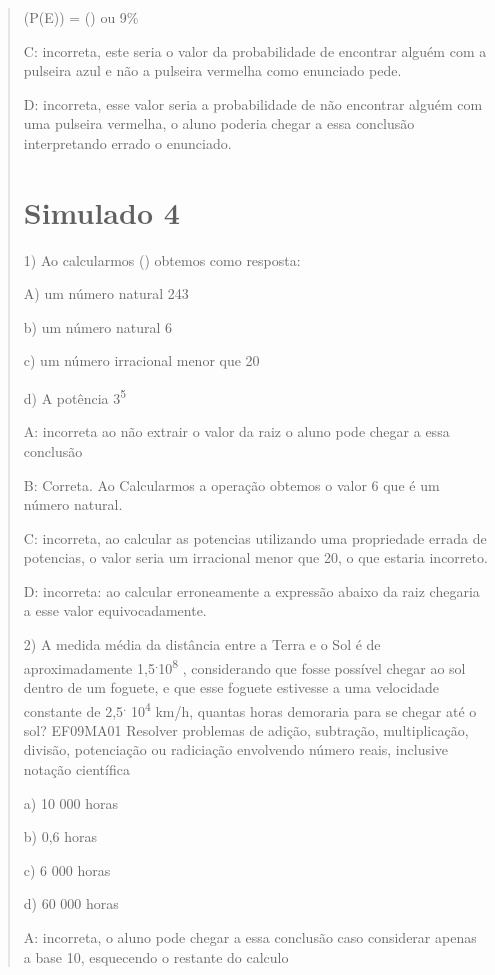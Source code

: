 \begin{quote}
\begin{escolha}
(P(E)) = () ou 9\%

C: incorreta, este seria o valor da probabilidade de encontrar alguém
com a pulseira azul e não a pulseira vermelha como enunciado pede.

D: incorreta, esse valor seria a probabilidade de não encontrar alguém
com uma pulseira vermelha, o aluno poderia chegar a essa conclusão
interpretando errado o enunciado.

\section{Simulado 4}

1) Ao calcularmos () obtemos como resposta:

A) um número natural 243

b) um número natural 6

c) um número irracional menor que 20

d) A potência 3\textsuperscript{5}

A: incorreta ao não extrair o valor da raiz o aluno pode chegar a essa
conclusão

B: Correta. Ao Calcularmos a operação obtemos o valor 6 que é um número
natural.

C: incorreta, ao calcular as potencias utilizando uma propriedade errada
de potencias, o valor seria um irracional menor que 20, o que estaria
incorreto.

D: incorreta: ao calcular erroneamente a expressão abaixo da raiz
chegaria a esse valor equivocadamente.

2) A medida média da distância entre a Terra e o Sol é de
aproximadamente 1,5\textsuperscript{.}10\textsuperscript{8} ,
considerando que fosse possível chegar ao sol dentro de um foguete, e
que esse foguete estivesse a uma velocidade constante de
2,5\textsuperscript{.} 10\textsuperscript{4} km/h, quantas horas
demoraria para se chegar até o sol? EF09MA01 Resolver problemas de
adição, subtração, multiplicação, divisão, potenciação ou radiciação
envolvendo número reais, inclusive notação científica

a) 10 000 horas

b) 0,6 horas

c) 6 000 horas

d) 60 000 horas

A: incorreta, o aluno pode chegar a essa conclusão caso considerar
apenas a base 10, esquecendo o restante do calculo


\end{escolha}
\end{quote}

